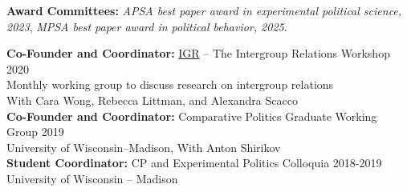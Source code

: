 \documentclass[11pt]{article}
\begin{document}
{\bf Award Committees:} \emph{APSA best paper award in experimental political science, 2023}, \emph{MPSA best paper award in political behavior, 2025}.\\\vspace*{-2mm}

{\bf Co-Founder and Coordinator:} \href{https://igr.netlify.app/}{IGR} -- The Intergroup Relations Workshop  \hfill  2020\\
Monthly working group to discuss research on intergroup relations\\
With Cara Wong, Rebecca Littman, and Alexandra Scacco\\
{\bf Co-Founder and Coordinator:} Comparative Politics Graduate Working Group \hfill  2019\\
University of Wisconsin--Madison, With Anton Shirikov\\
{\bf Student Coordinator:} CP and Experimental Politics Colloquia \hfill  2018-2019\\
University of Wisconsin -- Madison\\\vspace*{-4mm}

\end{document}
